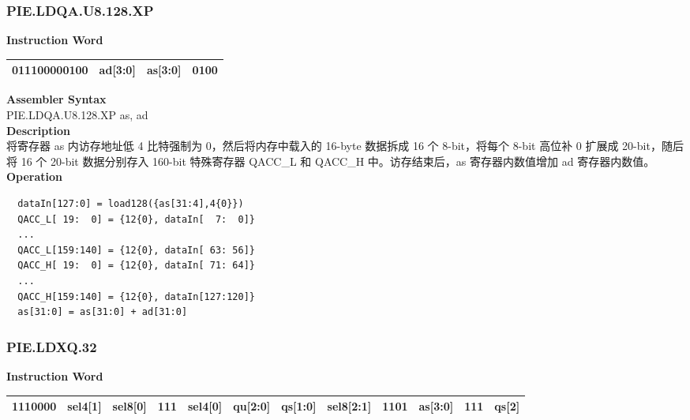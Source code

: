 \newpage
\subsubsection{PIE.LDQA.U8.128.XP}\label{instruction:PIELDQAU8128XP}
\setlength\tabcolsep{6pt}
\textbf{Instruction Word} \\
\begin{tabular}{|c|c|c|c|}
	\hline
	011100000100 & ad[3:0] & as[3:0] & 0100 \\
	\hline
\end{tabular}

\textbf{Assembler Syntax} \\
PIE.LDQA.U8.128.XP as, ad \\
\textbf{Description} \\
将寄存器 as 内访存地址低 4 比特强制为 0，然后将内存中载入的 16-byte 数据拆成 16 个 8-bit，将每个 8-bit 高位补 0 扩展成 20-bit，随后将 16 个 20-bit 数据分别存入 160-bit 特殊寄存器 QACC\_L 和 QACC\_H 中。访存结束后，as 寄存器内数值增加 ad 寄存器内数值。\\
\textbf{Operation}
\begin{lstlisting}
  dataIn[127:0] = load128({as[31:4],4{0}})
  QACC_L[ 19:  0] = {12{0}, dataIn[  7:  0]}
  ...
  QACC_L[159:140] = {12{0}, dataIn[ 63: 56]}
  QACC_H[ 19:  0] = {12{0}, dataIn[ 71: 64]}
  ...
  QACC_H[159:140] = {12{0}, dataIn[127:120]}
  as[31:0] = as[31:0] + ad[31:0]
\end{lstlisting}

\newpage
\subsubsection{PIE.LDXQ.32}\label{instruction:PIELDXQ32}
\setlength\tabcolsep{6pt}
\textbf{Instruction Word} \\
\begin{tabular}{|c|c|c|c|c|c|c|c|c|c|c|c|}
	\hline
	1110000 & sel4[1] & sel8[0] & 111 & sel4[0] & qu[2:0] & qs[1:0] & sel8[2:1] & 1101 & as[3:0] & 111 & qs[2] \\
	\hline
\end{tabular}

